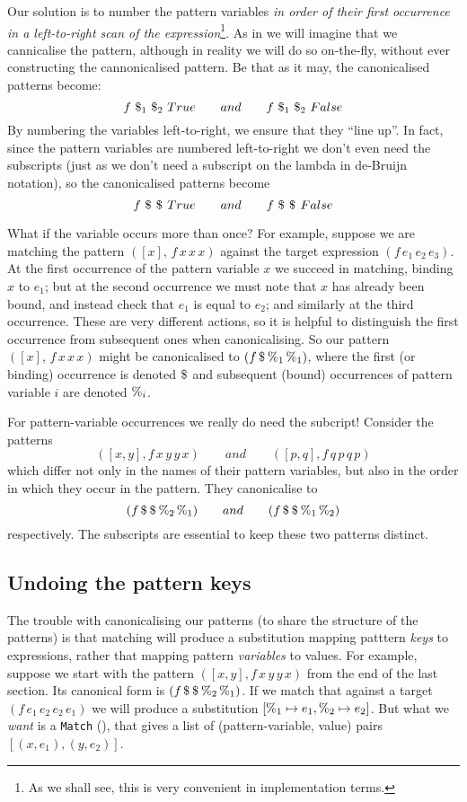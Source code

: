 \documentclass[acmsmall]{acmart}
\theoremstyle{theorem}
\theoremstyle{definition}
\theoremstyle{remark}
\begin{document}
Our solution is to number the pattern variables \emph{in order of their
first occurrence in a left-to-right scan of the expression}\footnote{As we shall
  see, this is very convenient in implementation terms.}.
As in  we will imagine that we cannicalise the pattern, although
in reality we will do so on-the-fly, without ever constructing the cannonicalised pattern.
Be that as it may, the canonicalised patterns become:
$$
   f~\$_{1}~\$_{2}~True      \qquad and \qquad  f~\$_{1}~\$_{2}~False
$$
By numbering the variables left-to-right, we ensure that they ``line up''.
In fact, since the pattern variables are numbered left-to-right we don't even
need the subscripts (just as we don't need a subscript on the lambda in
de-Bruijn notation), so the canonicalised patterns become
$$
   f~\$_{}~\$_{}~True      \qquad and \qquad  f~\$_{}~\$_{}~False
$$


What if the variable occurs more than once? For example, suppose we are matching
the pattern $([x],\, f\, x\,x\,x)$ against the target expression
$(f\,e_1\,e_2\,e_3)$.  At the first occurrence of the pattern variable $x$
we succeed in matching, binding $x$ to $e_1$; but at the second
occurrence we must note that $x$ has already been bound, and instead
check that $e_1$ is equal to $e_2$; and similarly at the third occurrence.
These are very different actions,
so it is helpful to distinguish the first occurrence from subsequent
ones when canonicalising.  So our pattern $([x],\, f\, x\,x\,x)$ might
be canonicalised to $(f\,\$_{}\,\%_{1}\,\%_{1})$, where the first (or binding) occurrence
is denoted $\$_{}$ and subsequent (bound) occurrences of pattern variable $i$ are denoted $\%_{i}$.

For pattern-variable occurrences we really do need the subcript! Consider the
patterns $$([x,y], f\,x\,y\,y\,x) \qquad and \qquad ([p,q], f\,q\,p\,q\,p)$$
which differ not only in the names of their pattern variables, but also in the
order in which they occur in the pattern.
They canonicalise to
$$(f \,\$_{}\, \$_{}\, \%_{2}\, \%_{1}) \qquad and  \qquad (f \,\$_{}\, \$_{}\, \%_{1}\, \%_{2})$$
respectively.  The subscripts are essential to keep these two patterns distinct.

\subsection{Undoing the pattern keys} \label{sec:patkeymap}

The trouble with canonicalising our patterns (to share the structure of the patterns)
is that matching will produce a substitution mapping patttern \emph{keys} to
expressions, rather that mapping pattern \emph{variables} to values.  For example,
suppose we start with the pattern $([x,y], f \,x\, y\, y\, x)$ from the
end of the last section. Its canonical form is $(f \,\$_{}\, \$_{}\, \%_{2}\, \%_{1})$.
If we match that against a target $(f\,e_1\,e_2\,e_2\,e_1)$ we will produce a substitution $[\%_{1} \mapsto e_1, \%_{2} \mapsto e_2]$.
But  what we \emph{want} is a \lstinline{Match} (),
that gives a list of (pattern-variable, value) pairs $[(x, e_1), (y,e_2)]$.
\end{document}
